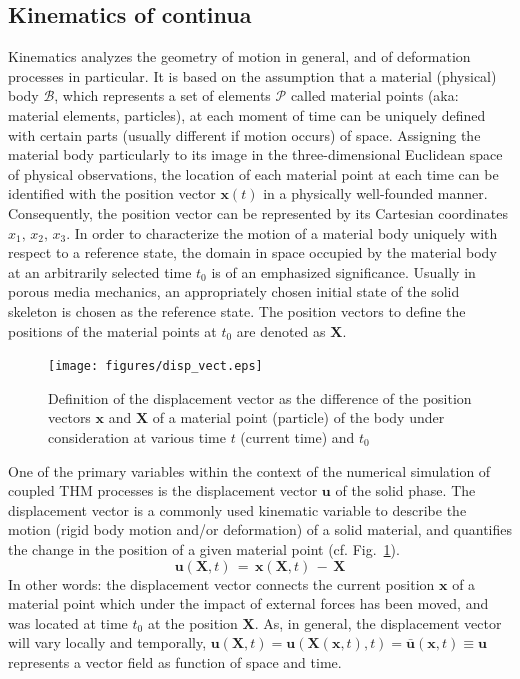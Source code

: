 \subsection{Kinematics of continua}
\label{sec:kinematics}

Kinematics analyzes the geometry of motion in general, and of deformation processes in particular. It is based on the assumption that a material (physical) body $\mathcal{B}$, which represents a set of elements $\mathcal{P}$ called material points (aka: material elements, particles), at each moment of time can be uniquely defined with certain parts (usually different if motion occurs) of space. Assigning the material body particularly to its image in the three-dimensional Euclidean space of physical observations, the location of each material point at each time can be identified with the position vector $\mathbf{x}(t)$ in a physically well-founded manner. Consequently, the position vector can be represented by its Cartesian coordinates $x_1,\,x_2,\,x_3$. In order to characterize the motion of a material body uniquely with respect to a reference state, the domain in space occupied by the material body at an arbitrarily selected time $t_0$ is of an emphasized significance. Usually in porous media mechanics, an appropriately chosen initial state of the solid skeleton is chosen as the reference state. The position vectors to define the positions of the material points at $t_0$ are denoted as $\mathbf{X}$.

\begin{figure}[htb!]
\begin{center}
\footnotesize
\texttt{[image: figures/disp\_vect.eps]}
\caption{Definition of the displacement vector as the difference of the position vectors $\mathbf{x}$ and $\mathbf{X}$ of a material point (particle) of the body under consideration at various time $t$ (current time) and $t_0$ \cite{Haupt:2002}}
\label{fig:disp_vect}
\end{center}
\end{figure}

One of the primary variables within the context of the numerical simulation of coupled THM processes is the displacement vector $\mathbf{u}$ of the solid phase. The displacement vector is a commonly used kinematic variable to describe the motion (rigid body motion and/or deformation) of a solid material, and quantifies the change in the position of a given material point (cf. Fig.~\ref{fig:disp_vect}).
\begin{equation}
\mathbf{u}(\mathbf{X},t)\,=\,\mathbf{x}(\mathbf{X},t)\,-\,\mathbf{X}
\label{eq:defvec}
\end{equation}
In other words: the displacement vector connects the current position $\mathbf{x}$ of a material point which under the impact of external forces has been moved, and was located at time $t_0$ at the position $\mathbf{X}$. As, in general, the displacement vector will vary locally and temporally, $\mathbf{u}(\mathbf{X},t)=\mathbf{u}(\mathbf{X}(\mathbf{x},t),t)=\bar{\mathbf{u}}(\mathbf{x}{}{},t)\equiv\mathbf{u}$ represents a vector field as function of space and time.

